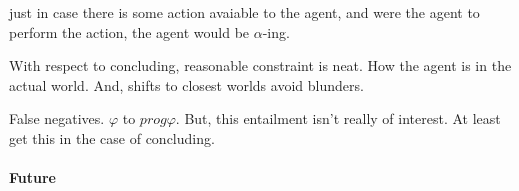\begin{note}
  \pevent{} just in case there is some action avaiable to the agent, and were the agent to perform the action, the agent would be \(\alpha\)-ing.
\end{note}

\begin{note}
  With respect to concluding, reasonable constraint is neat.
  How the agent is in the actual world.
  And, shifts to closest worlds avoid blunders.
\end{note}

\begin{note}
  False negatives.
  \(\varphi\) to \(prog \varphi\).
  But, this entailment isn't really of interest.
  At least get this in the case of concluding.
\end{note}

\paragraph{Future}

